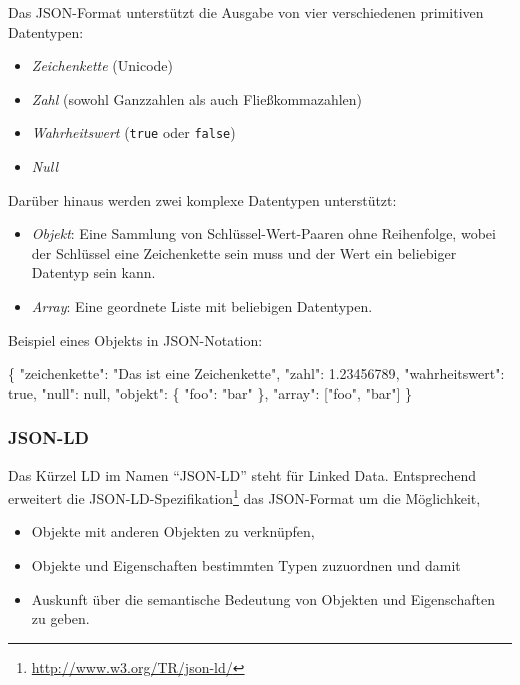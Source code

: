 \documentclass[,a4paper]{article}
\newenvironment{Shaded}{}{}
\newcommand{\DataTypeTok}[1]{\textcolor[rgb]{0.56,0.13,0.00}{{#1}}}
\newcommand{\DecValTok}[1]{\textcolor[rgb]{0.25,0.63,0.44}{{#1}}}
\newcommand{\FloatTok}[1]{\textcolor[rgb]{0.25,0.63,0.44}{{#1}}}
\newcommand{\StringTok}[1]{\textcolor[rgb]{0.25,0.44,0.63}{{#1}}}
\newcommand{\NormalTok}[1]{{#1}}
\begin{document}
Das JSON-Format unterstützt die Ausgabe von vier verschiedenen
primitiven Datentypen:

\begin{itemize}
\item
  \emph{Zeichenkette} (Unicode)
\item
  \emph{Zahl} (sowohl Ganzzahlen als auch Fließkommazahlen)
\item
  \emph{Wahrheitswert} (\texttt{true} oder \texttt{false})
\item
  \emph{Null}
\end{itemize}

Darüber hinaus werden zwei komplexe Datentypen unterstützt:

\begin{itemize}
\item
  \emph{Objekt}: Eine Sammlung von Schlüssel-Wert-Paaren ohne
  Reihenfolge, wobei der Schlüssel eine Zeichenkette sein muss und der
  Wert ein beliebiger Datentyp sein kann.
\item
  \emph{Array}: Eine geordnete Liste mit beliebigen Datentypen.
\end{itemize}

Beispiel eines Objekts in JSON-Notation:

\begin{Shaded}
\begin{Highlighting}[]
\NormalTok{\{}
    \DataTypeTok{"zeichenkette"}\NormalTok{: }\StringTok{"Das ist eine Zeichenkette"}\NormalTok{,}
    \DataTypeTok{"zahl"}\NormalTok{: }\FloatTok{1.23456789}\NormalTok{,}
    \DataTypeTok{"wahrheitswert"}\NormalTok{: }\DecValTok{true}\NormalTok{,}
    \DataTypeTok{"null"}\NormalTok{: }\DecValTok{null}\NormalTok{,}
    \DataTypeTok{"objekt"}\NormalTok{: \{}
        \DataTypeTok{"foo"}\NormalTok{: }\StringTok{"bar"}
    \NormalTok{\},}
    \DataTypeTok{"array"}\NormalTok{: [}\StringTok{"foo"}\NormalTok{, }\StringTok{"bar"}\NormalTok{]}
\NormalTok{\}}
\end{Highlighting}
\end{Shaded}

\subsubsection{JSON-LD}

Das Kürzel LD im Namen ``JSON-LD'' steht für Linked Data. Entsprechend
erweitert die JSON-LD-Spezifikation\footnote{\url{http://www.w3.org/TR/json-ld/}}
das JSON-Format um die Möglichkeit,

\begin{itemize}
\item
  Objekte mit anderen Objekten zu verknüpfen,
\item
  Objekte und Eigenschaften bestimmten Typen zuzuordnen und damit
\item
  Auskunft über die semantische Bedeutung von Objekten und Eigenschaften
  zu geben.
\end{itemize}
\end{document}
